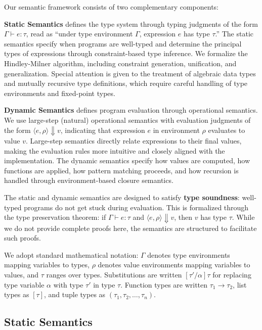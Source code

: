 \documentclass[conference,onecolumn]{IEEEtran}
\begin{document}
Our semantic framework consists of two complementary components:

\textbf{Static Semantics} defines the type system through typing judgments of the form $\Gamma \vdash e : \tau$, read as ``under type environment $\Gamma$, expression $e$ has type $\tau$.'' The static semantics specify when programs are well-typed and determine the principal types of expressions through constraint-based type inference. We formalize the Hindley-Milner algorithm, including constraint generation, unification, and generalization. Special attention is given to the treatment of algebraic data types and mutually recursive type definitions, which require careful handling of type environments and fixed-point types.

\textbf{Dynamic Semantics} defines program evaluation through operational semantics. We use large-step (natural) operational semantics with evaluation judgments of the form $\langle e, \rho \rangle \Downarrow v$, indicating that expression $e$ in environment $\rho$ evaluates to value $v$. Large-step semantics directly relate expressions to their final values, making the evaluation rules more intuitive and closely aligned with the implementation. The dynamic semantics specify how values are computed, how functions are applied, how pattern matching proceeds, and how recursion is handled through environment-based closure semantics.

The static and dynamic semantics are designed to satisfy \textbf{type soundness}: well-typed programs do not get stuck during evaluation. This is formalized through the type preservation theorem: if $\Gamma \vdash e : \tau$ and $\langle e, \rho \rangle \Downarrow v$, then $v$ has type $\tau$. While we do not provide complete proofs here, the semantics are structured to facilitate such proofs.

We adopt standard mathematical notation: $\Gamma$ denotes type environments mapping variables to types, $\rho$ denotes value environments mapping variables to values, and $\tau$ ranges over types. Substitutions are written $[\tau'/\alpha]\tau$ for replacing type variable $\alpha$ with type $\tau'$ in type $\tau$. Function types are written $\tau_1 \rightarrow \tau_2$, list types as $[\tau]$, and tuple types as $(\tau_1, \tau_2, \ldots, \tau_n)$.

\subsection{Static Semantics}
\end{document}
